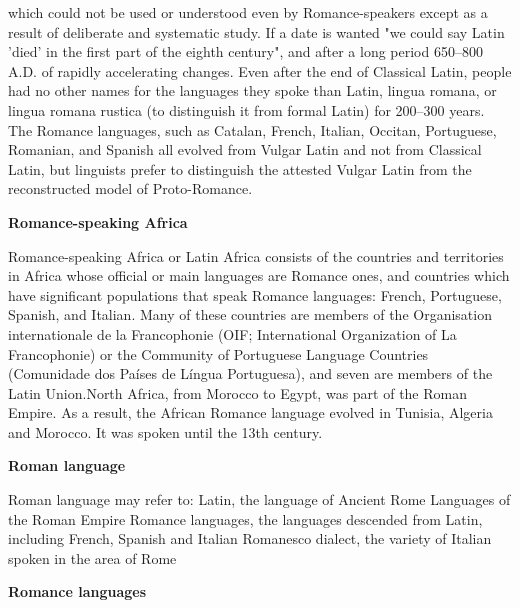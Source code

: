 \documentclass[11pt]{scrartcl} %
\begin{document}
which could not be used or understood even by Romance-speakers except as a result of deliberate and systematic study. If a date is wanted "we could say Latin 'died' in the first part of the eighth century", and after a long period 650–800 A.D. of rapidly accelerating changes. Even after the end of Classical Latin, people had no other names for the languages they spoke than Latin, lingua romana, or lingua romana rustica (to distinguish it from formal Latin) for 200–300 years. The Romance languages, such as Catalan, French, Italian, Occitan, Portuguese, Romanian, and Spanish all evolved from Vulgar Latin and not from Classical Latin, but linguists prefer to distinguish the attested Vulgar Latin from the reconstructed model of Proto-Romance. \par

\noindent \textbf{Romance-speaking Africa} \par

Romance-speaking Africa or Latin Africa consists of the countries and territories in Africa whose official or main languages are Romance ones, and countries which have significant populations that speak Romance languages: French, Portuguese, Spanish, and Italian. Many of these countries are members of the Organisation internationale de la Francophonie (OIF; International Organization of La Francophonie) or the Community of Portuguese Language Countries (Comunidade dos Países de Língua Portuguesa), and seven are members of the Latin Union.North Africa, from Morocco to Egypt, was part of the Roman Empire. As a result, the African Romance language evolved in Tunisia, Algeria and Morocco. It was spoken until the 13th century.\par

\noindent \textbf{Roman language} \par

Roman language may refer to: Latin, the language of Ancient Rome Languages of the Roman Empire Romance languages, the languages descended from Latin, including French, Spanish and Italian Romanesco dialect, the variety of Italian spoken in the area of Rome\par

\noindent \textbf{Romance languages} \par
\end{document}
